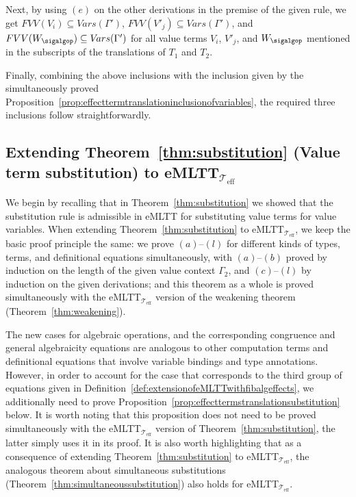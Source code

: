 Next, by using $(e)$ on the other derivations in the premise of the given rule, we get $FVV(V_i) \subseteq V\!ars(\Gamma')$, $FVV(V'_{\!j}) \subseteq V\!ars(\Gamma')$, and $FVV(W_{\sigalgop}) \subseteq V\!ars(\Gamma')$ for all value terms $V_i$, $V'_{\!j}$, and $W_{\sigalgop}$ mentioned in the subscripts of the translations of $T_1$ and $T_2$. 

Finally, combining the above inclusions with the inclusion given by the simultaneously proved Proposition~\ref{prop:effecttermtranslationinclusionofvariables}, the required three inclusions follow straightforwardly.

\subsection*{Extending Theorem~\ref{thm:substitution} (Value term substitution) to eMLTT$_{\!\mathcal{T}_{\text{eff}}}$}

We begin by recalling that in Theorem~\ref{thm:substitution} we showed that the substitution rule is admissible in eMLTT for substituting value terms for value variables. When extending Theorem~\ref{thm:substitution} to eMLTT$_{\mathcal{T}_{\text{eff}}}$, we keep the basic proof principle the same: we prove $(a)$--$(l)$ for different kinds of types, terms, and definitional equations simultaneously, with $(a)$--$(b)$ proved by induction on the length of the given value context $\Gamma_2$, and $(c)$--$(l)$  by induction on the given derivations; and this theorem as a whole is proved simultaneously with the eMLTT$_{\mathcal{T}_{\text{eff}}}$ version of the weakening theorem (Theorem~\ref{thm:weakening}). 

The new cases for algebraic operations, and the corresponding congruence and general algebraicity equations are analogous to other computation terms and definitional equations that involve variable bindings and type annotations. However, in order to account for the case that corresponds to the third group of equations given in Definition~\ref{def:extensionofeMLTTwithfibalgeffects}, we additionally need to prove Proposition~\ref{prop:effecttermstranslationsubstitution} below. It is worth noting that this  proposition does not need to be proved simultaneously with the eMLTT$_{\mathcal{T}_{\text{eff}}}$ version of Theorem~\ref{thm:substitution}, the latter simply uses it in its proof. 
%
It is also worth highlighting that as a consequence of extending Theorem~\ref{thm:substitution} to eMLTT$_{\!\mathcal{T}_{\text{eff}}}$, 
the analogous theorem about simultaneous substitutions (Theorem~\ref{thm:simultaneoussubstitution}) also holds for eMLTT$_{\!\mathcal{T}_{\text{eff}}}$.

